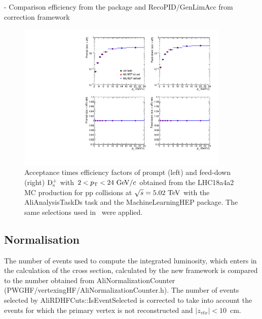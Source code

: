 - Comparison efficiency from the package and RecoPID/GenLimAcc from correction framework

\begin{figure}[tb]
\begin{center}
\includegraphics[width=0.9\textwidth]{figures/DsEfficiencyComparison.pdf}
\caption{Acceptance times efficiency factors of prompt (left) and feed-down (right) $\rm D_s^+$ with $2<p_{\rm T}<24~\mathrm{GeV}/c$ obtained from the LHC18a4a2 MC production for pp collisions at $\sqrt{s}=5.02~\mathrm{TeV}$ with the AliAnalysisTaskDs task and the MachineLearningHEP package. The same selections used in~\cite{Acharya:2019mgn} were applied.}
\label{fig:EffDsComparisonMCpp} 
\end{center}
\end{figure}

\subsection{Normalisation}
\label{subsec:normValidation}

The number of events used to compute the integrated luminosity, which enters in the calculation of the cross section, calculated by the new framework is compared to the number obtained from AliNormalizationCounter (PWGHF/vertexingHF/AliNormalizationCounter.h). The number of events selected by AliRDHFCuts::IsEventSelected is corrected to take into account the events for which the primary vertex is not reconstructed and $|z_{vtx}|<10$~cm. 
 
